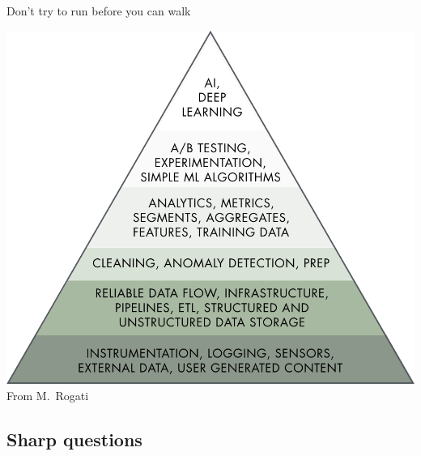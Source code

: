 \begin{frame}{Don't try to run before you can walk}
    \begin{center}
        \includegraphics[height=0.8\textheight]{figures/ai_hierarchy} \\
        {\scriptsize%
         From M.\ Rogati}
    \end{center}
\end{frame}

\subsection{Sharp questions}

